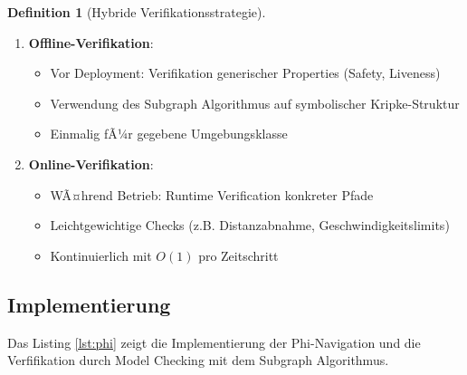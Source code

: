 ﻿\documentclass[a4paper,12pt]{article}
\theoremstyle{definition}
\newtheorem{definition}{Definition}[section]
\begin{document}
\begin{definition}[Hybride Verifikationsstrategie]
\begin{enumerate}
	\item \textbf{Offline-Verifikation}: 
	\begin{itemize}
		\item Vor Deployment: Verifikation generischer Properties (Safety, Liveness)
		\item Verwendung des Subgraph Algorithmus auf symbolischer Kripke-Struktur
		\item Einmalig fÃ¼r gegebene Umgebungsklasse
	\end{itemize}
	
	\item \textbf{Online-Verifikation}:
	\begin{itemize}
		\item WÃ¤hrend Betrieb: Runtime Verification konkreter Pfade
		\item Leichtgewichtige Checks (z.B. Distanzabnahme, Geschwindigkeitslimits)
		\item Kontinuierlich mit $O(1)$ pro Zeitschritt
	\end{itemize}
\end{enumerate}
\end{definition}

\subsection{Implementierung}

Das Listing \ref{lst:phi} zeigt die Implementierung der Phi-Navigation und die Verfifikation durch Model Checking mit dem Subgraph Algorithmus.
\end{document}
